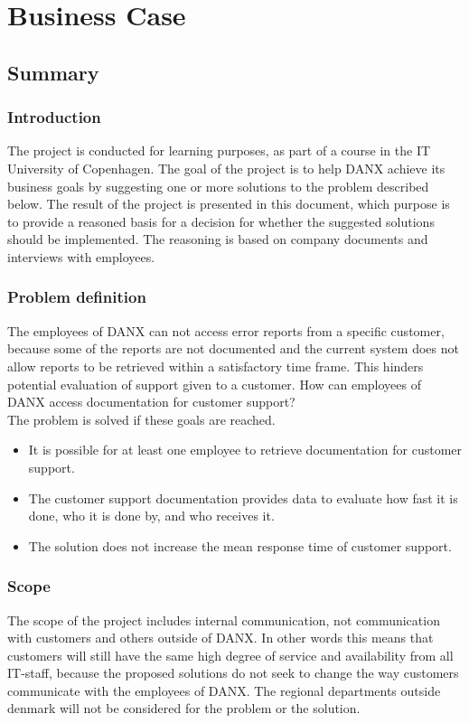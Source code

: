 \chapter{Business Case}
\section{Summary}
\subsection{Introduction}
The project is conducted for learning purposes, as part of a course in the IT University of Copenhagen. The goal of the project is to help DANX achieve its business goals by suggesting one or more solutions to the problem described below. The result of the project is presented in this document, which purpose is to provide a reasoned basis for a decision for whether the suggested solutions should be implemented. The reasoning is based on company documents and interviews with employees.
\subsection{Problem definition}
The employees of DANX can not access error reports from a specific customer, because some of the reports are not documented and the current system does not allow reports to be retrieved within a satisfactory time frame. This hinders potential evaluation of support given to a customer.
How can employees of DANX access documentation for customer support? \\

The problem is solved if these goals are reached.
\begin{itemize}
	\item It is possible for at least one employee to retrieve documentation for customer support.
	\item The customer support documentation provides data to evaluate how fast it is done, who it is done by, and who receives it.
	\item The solution does not increase the mean response time of customer support.
\end{itemize}

\subsection{Scope}
The scope of the project includes internal communication, not communication with customers and others outside of DANX. In other words this means that customers will still have the same high degree of service and availability from all IT-staff, because the proposed solutions do not seek to change the way customers communicate with the employees of DANX. The regional departments outside denmark will not be considered for the problem or the solution.

